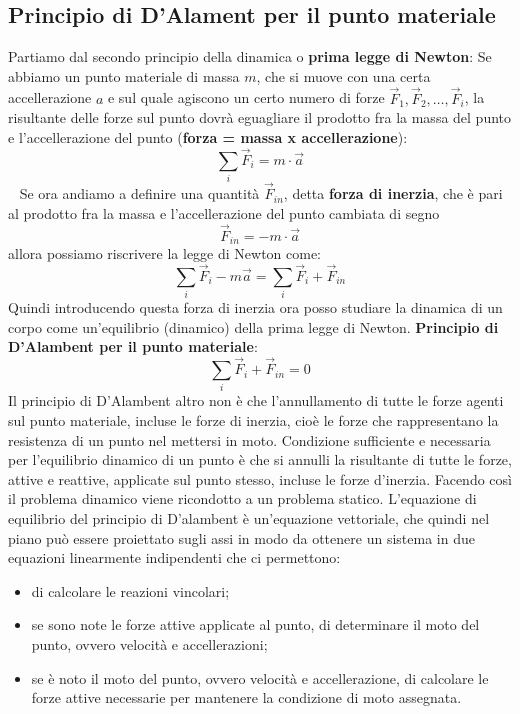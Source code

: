 \subsection{Principio di D'Alament per il punto materiale}
Partiamo dal secondo principio della dinamica o \textbf{prima legge di Newton}:\newline
Se abbiamo un punto materiale di massa $m$, che si muove con una certa accellerazione $a$ e sul quale agiscono un certo numero di forze $\vec{F}_1, \vec{F}_2, \dots, \vec{F}_i$, la risultante delle forze sul punto dovrà eguagliare il prodotto fra la massa del punto e l'accellerazione del punto (\textbf{forza = massa x accellerazione}):
\[
    \sum_{i} \vec{F}_{i} = m \cdot \vec{a}
\]
\ \newline
Se ora andiamo a definire una quantità $\vec{F}_{in}$, detta \textbf{forza di inerzia}, che è pari al prodotto fra la massa e l'accellerazione del punto cambiata di segno
\[
    \vec{F}_{in} = - m \cdot  \vec{a}
\]
allora possiamo riscrivere la legge di Newton come:
\[
    \sum_{i} \vec{F}_i - m \vec{a} = \sum_{i} \vec{F}_{i} + \vec{F}_{in}
\]
Quindi introducendo questa forza di inerzia ora posso studiare la dinamica di un corpo come un'equilibrio (dinamico) della prima legge di Newton.\newline
\newline
\textbf{Principio di D'Alambent per il punto materiale}:
\[
    \sum_{i} \vec{F}_{i} + \vec{F}_{in} = 0
\]
Il principio di D'Alambent altro non è che l'annullamento di tutte le forze agenti sul punto materiale, incluse le forze di inerzia, cioè le forze che rappresentano la resistenza di un punto nel mettersi in moto.\newline
\newline
Condizione sufficiente e necessaria per l'equilibrio dinamico di un punto è che si annulli la risultante di tutte le forze, attive e reattive, applicate sul punto stesso, incluse le forze d'inerzia.\newline
\newline
Facendo così il problema dinamico viene ricondotto a un problema statico.\newline
\newline
L'equazione di equilibrio del principio di D'alambent è un'equazione vettoriale, che quindi nel piano può essere proiettato sugli assi in modo da ottenere un sistema in due equazioni linearmente indipendenti che ci permettono:
\begin{itemize}
    \item di calcolare le reazioni vincolari;
    \item se sono note le forze attive applicate al punto, di determinare il moto del punto, ovvero velocità e accellerazioni;
    \item se è noto il moto del punto, ovvero velocità e accellerazione, di calcolare le forze attive necessarie per mantenere la condizione di moto assegnata.
\end{itemize}
